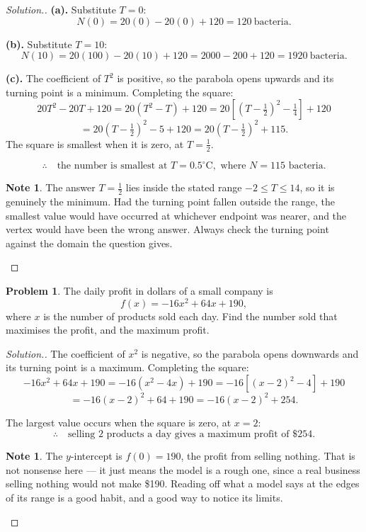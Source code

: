 \documentclass[11pt,a4paper]{article}
\theoremstyle{definition}
\newtheorem{note}[thm]{Note}
\newtheorem{problemx}{Problem}[section]
\newenvironment{problem}{\begin{problemx}}{\end{problemx}}
\newenvironment{solution}
  {\renewcommand{\qedsymbol}{}\begin{proof}[\textit{Solution}.]}
  {\end{proof}}
\begin{document}
\begin{solution}
\textbf{(a).} Substitute $T=0$:
$$N(0)=20(0)-20(0)+120=120\ \text{bacteria}.$$

\textbf{(b).} Substitute $T=10$:
$$N(10)=20(100)-20(10)+120=2000-200+120=1920\ \text{bacteria}.$$

\textbf{(c).} The coefficient of $T^2$ is positive, so the parabola opens upwards and
its turning point is a minimum. Completing the square:
$$20T^2-20T+120=20\left(T^2-T\right)+120
=20\left[\left(T-\tfrac{1}{2}\right)^2-\tfrac{1}{4}\right]+120$$
$$=20\left(T-\tfrac{1}{2}\right)^2-5+120=20\left(T-\tfrac{1}{2}\right)^2+115.$$
The square is smallest when it is zero, at $T=\frac{1}{2}$.

$$\therefore\quad \text{the number is smallest at } T=0.5^\circ\text{C},
\text{ where } N=115 \text{ bacteria}.$$

\begin{note}
The answer $T=\frac{1}{2}$ lies inside the stated range $-2\leq T\leq 14$, so it is
genuinely the minimum. Had the turning point fallen outside the range, the smallest
value would have occurred at whichever endpoint was nearer, and the vertex would have
been the wrong answer. Always check the turning point against the domain the question
gives.
\end{note}
\end{solution}

\begin{problem}
The daily profit in dollars of a small company is
$$f(x)=-16x^2+64x+190,$$
where $x$ is the number of products sold each day. Find the number sold that maximises
the profit, and the maximum profit.
\end{problem}

\begin{solution}
The coefficient of $x^2$ is negative, so the parabola opens downwards and its turning
point is a maximum. Completing the square:
$$-16x^2+64x+190=-16\left(x^2-4x\right)+190
=-16\left[(x-2)^2-4\right]+190$$
$$=-16(x-2)^2+64+190=-16(x-2)^2+254.$$

The largest value occurs when the square is zero, at $x=2$:
$$\therefore\quad \text{selling } 2 \text{ products a day gives a maximum profit of
\$}254.$$

\begin{note}
The $y$-intercept is $f(0)=190$, the profit from selling nothing. That is not
nonsense here --- it just means the model is a rough one, since a real business selling
nothing would not make \$190. Reading off what a model says at the edges of its range is
a good habit, and a good way to notice its limits.
\end{note}
\end{solution}
\end{document}
